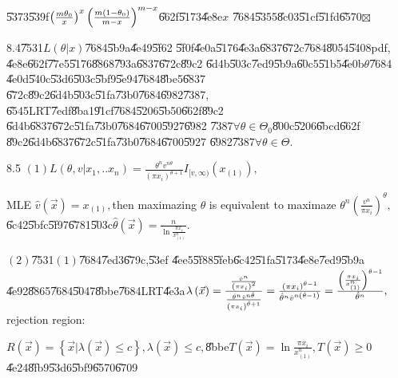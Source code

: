 \documentclass{article}
\begin{document}
\U{5373}\U{539f}$\left( \frac{m\theta _{0}}{x}\right) ^{x}\left( \frac{%
m\left( 1-\theta _{0}\right) }{m-x}\right) ^{m-x}$\U{662f}\U{5173}\U{4e8e}$x$%
\U{7684}\U{5355}\U{8c03}\U{51cf}\U{51fd}\U{6570}$\boxtimes $

8.4\U{7531}$L\left( \theta |x\right) $\U{7684}\U{5b9a}\U{4e49}\U{5f62}%
\U{5f0f}\U{4e0a}\U{5176}\U{4e3a}\U{6837}\U{672c}\U{7684}\U{8054}\U{5408}pdf,%
\U{4e8e}\U{662f}\U{77e5}\U{5176}\U{8868}\U{793a}\U{6837}\U{672c}\U{89c2}%
\U{6d4b}\U{503c}\U{7ed9}\U{5b9a}\U{60c5}\U{51b5}\U{4e0b}$\theta $\U{7684}%
\U{4e0d}\U{540c}\U{53d6}\U{503c}\U{5bf9}\U{5e94}\U{7684}\U{8be5}\U{6837}%
\U{672c}\U{89c2}\U{6d4b}\U{503c}\U{51fa}\U{73b0}\U{7684}\U{6982}\U{7387},%
\U{6545}LRT\U{7edf}\U{8ba1}\U{91cf}\U{7684}\U{5206}\U{5b50}\U{662f}\U{89c2}%
\U{6d4b}\U{6837}\U{672c}\U{51fa}\U{73b0}\U{7684}\U{6700}\U{5927}\U{6982}%
\U{7387}$\forall \theta \in \Theta _{0}$\U{800c}\U{5206}\U{6bcd}\U{662f}%
\U{89c2}\U{6d4b}\U{6837}\U{672c}\U{51fa}\U{73b0}\U{7684}\U{6700}\U{5927}%
\U{6982}\U{7387}$\forall \theta \in \Theta .$

8.5 $\left( 1\right) L\left( \theta ,v|x_{1},..x_{n}\right) =\frac{\theta
^{n}v^{n\theta }}{\left( \pi x_{i}\right) ^{\theta +1}}I_{[v,\infty )}\left(
x_{\left( 1\right) }\right) ,$

MLE $\hat{v}\left( \vec{x}\right) =x_{\left( 1\right) },$then maximazing $%
\theta $ is equivalent to maximaze $\theta ^{n}\left( \frac{v^{n}}{\pi x_{i}}%
\right) ^{\theta },$\U{6c42}\U{5bfc}\U{5f97}\U{6781}\U{503c}$\hat{\theta}%
\left( \vec{x}\right) =\frac{n}{\ln \frac{\pi x_{i}}{x_{\left( 1\right) }^{n}%
}}.$

$\left( 2\right) $\U{7531}$\left( 1\right) $\U{7684}\U{7ed3}\U{679c},\U{53ef}%
\U{4ee5}\U{5f88}\U{5feb}\U{6c42}\U{51fa}\U{5173}\U{4e8e}\U{7ed9}\U{5b9a}%
\U{4e92}\U{8865}\U{7684}\U{5047}\U{8bbe}\U{7684}LRT\U{4e3a}$\lambda \left( 
\vec{x}\right) =\frac{\frac{\hat{v}^{n}}{\left( \pi x_{i}\right) ^{2}}}{%
\frac{\hat{\theta}^{n}\hat{v}^{n\hat{\theta}}}{\left( \pi x_{i}\right) ^{%
\hat{\theta}+1}}}=\frac{\left( \pi x_{i}\right) ^{\hat{\theta}-1}}{\hat{%
\theta}^{n}\hat{v}^{n\left( \hat{\theta}-1\right) }}=\frac{\left( \frac{\pi
x_{i}}{x_{\left( 1\right) }^{n}}\right) ^{\hat{\theta}-1}}{\hat{\theta}^{n}}%
, $rejection region:

$R\left( \vec{x}\right) =\left\{ \vec{x}|\lambda \left( \vec{x}\right) \leq
c\right\} ,\lambda \left( \vec{x}\right) \leq c,$\U{8bbe}$T\left( \vec{x}%
\right) =\ln \frac{\pi x_{i}}{x_{\left( 1\right) }^{n}},T\left( \vec{x}%
\right) \geq 0$\U{4e24}\U{8fb9}\U{53d6}\U{5bf9}\U{6570}\U{6709}\qquad
\end{document}
